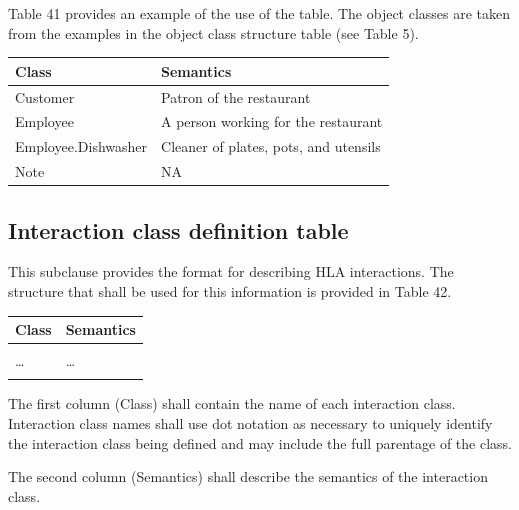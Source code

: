 Table 41 provides an example of the use of the table. The object classes are taken from the examples in the object class structure table (see Table 5).

\begingroup
\fontsize{8.35}{9.55}\selectfont
\setlength{\tabcolsep}{5pt}\renewcommand{\arraystretch}{1.13}
\noindent\begin{tabularx}{0.73\textwidth}{|L{145pt}|Y|}
\hline
\centering\arraybackslash\bfseries Class & \centering\arraybackslash\bfseries Semantics \\
\hline
Customer & Patron of the restaurant \\
\hline
Employee & A person working for the restaurant \\
\hline
Employee.Dishwasher & Cleaner of plates, pots, and utensils \\
\hline
Note & NA \\
\hline
\end{tabularx}
\endgroup

\subsection{Interaction class definition table}
This subclause provides the format for describing HLA interactions. The structure that shall be used for this information is provided in Table 42.

\begingroup
\fontsize{8.35}{9.55}\selectfont
\setlength{\tabcolsep}{5pt}\renewcommand{\arraystretch}{1.13}
\noindent\begin{tabularx}{0.73\textwidth}{|C{145pt}|Y|}
\hline
\bfseries Class & \centering\arraybackslash\bfseries Semantics \\
\hline
{} & \centering\arraybackslash {} \\
\hline
\ldots & \centering\arraybackslash \ldots \\
\hline
{} & \centering\arraybackslash {} \\
\hline
\end{tabularx}
\endgroup

The first column (Class) shall contain the name of each interaction class. Interaction class names shall use dot notation as necessary to uniquely identify the interaction class being defined and may include the full parentage of the class.

The second column (Semantics) shall describe the semantics of the interaction class.

